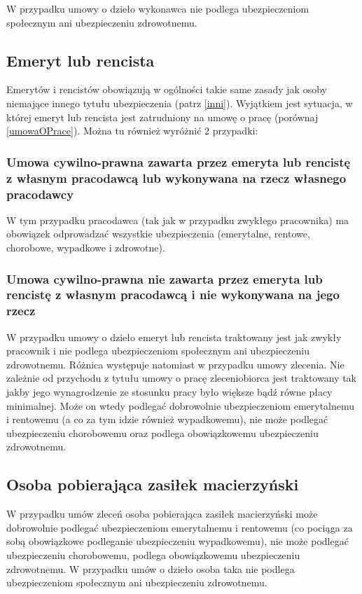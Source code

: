 W przypadku umowy o dzieło wykonawca nie podlega ubezpieczeniom społecznym ani ubezpieczeniu zdrowotnemu.

\subsection[Emeryt lub rencista][Emeryt lub rencista]{Emeryt lub rencista}
Emerytów i rencistów obowiązują w ogólności takie same zasady jak osoby niemające innego tytułu ubezpieczenia (patrz \ref{inni}).
Wyjątkiem jest sytuacja, w której emeryt lub rencista jest zatrudniony na umowę o pracę (porównaj \ref{umowaOPrace}). Można tu również wyróżnić 2 przypadki:

\subsubsection{Umowa cywilno-prawna zawarta przez emeryta lub rencistę z własnym pracodawcą lub wykonywana na rzecz własnego pracodawcy}
W tym przypadku pracodawca (tak jak w przypadku zwykłego pracownika) ma obowiązek odprowadzać wszystkie ubezpieczenia (emerytalne, rentowe, chorobowe, wypadkowe i zdrowotne).

\subsubsection{Umowa cywilno-prawna nie zawarta przez emeryta lub rencistę z własnym pracodawcą i nie wykonywana na jego rzecz}
W przypadku umowy o dzieło emeryt lub rencista traktowany jest jak zwykły pracownik i nie podlega ubezpieczeniom społecznym ani ubezpieczeniu zdrowotnemu. Różnica występuje natomiast w przypadku umowy zlecenia. Nie zależnie od przychodu z tytułu umowy o pracę zleceniobiorca jest traktowany tak jakby jego wynagrodzenie ze stosunku pracy było większe bądź równe płacy minimalnej. Może on wtedy podlegać dobrowolnie ubezpieczeniom emerytalnemu i rentowemu (a co za tym idzie również wypadkowemu), nie może podlegać ubezpieczeniu chorobowemu oraz podlega obowiązkowemu ubezpieczeniu zdrowotnemu.

\subsection[Osoba pobierająca zasiłek macierzyński][Osoba pobierająca zasiłek macierzyński]{Osoba pobierająca zasiłek macierzyński}
W przypadku umów zleceń osoba pobierająca zasiłek macierzyński może dobrowolnie podlegać ubezpieczeniom emerytalnemu i rentowemu (co pociąga za sobą obowiązkowe podleganie ubezpieczeniu wypadkowemu), nie może podlegać ubezpieczeniu chorobowemu, podlega obowiązkowemu ubezpieczeniu zdrowotnemu. W przypadku umów o dzieło osoba taka nie podlega ubezpieczeniom społecznym ani ubezpieczeniu zdrowotnemu.

